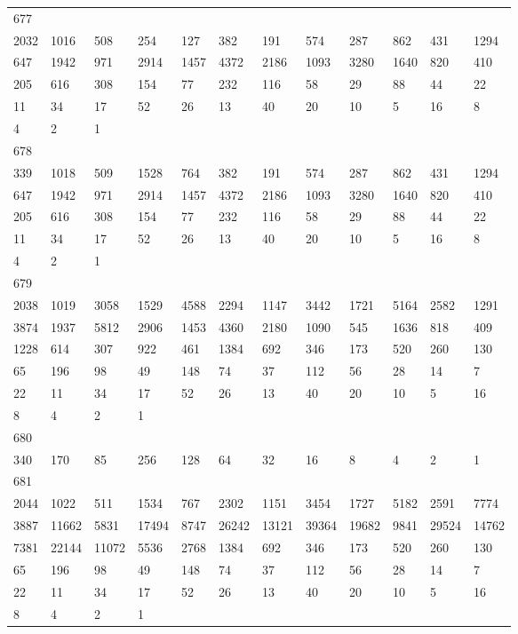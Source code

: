 \begin{longtable}{llllllllllll}
677&&&&&&&&&&&\\
2032& 1016& 508& 254& 127& 382& 191& 574& 287& 862& 431& 1294\\
647& 1942& 971& 2914& 1457& 4372& 2186& 1093& 3280& 1640& 820& 410\\
205& 616& 308& 154& 77& 232& 116& 58& 29& 88& 44& 22\\
11& 34& 17& 52& 26& 13& 40& 20& 10& 5& 16& 8\\
4& 2& 1& \\

678&&&&&&&&&&&\\
339& 1018& 509& 1528& 764& 382& 191& 574& 287& 862& 431& 1294\\
647& 1942& 971& 2914& 1457& 4372& 2186& 1093& 3280& 1640& 820& 410\\
205& 616& 308& 154& 77& 232& 116& 58& 29& 88& 44& 22\\
11& 34& 17& 52& 26& 13& 40& 20& 10& 5& 16& 8\\
4& 2& 1& \\

679&&&&&&&&&&&\\
2038& 1019& 3058& 1529& 4588& 2294& 1147& 3442& 1721& 5164& 2582& 1291\\
3874& 1937& 5812& 2906& 1453& 4360& 2180& 1090& 545& 1636& 818& 409\\
1228& 614& 307& 922& 461& 1384& 692& 346& 173& 520& 260& 130\\
65& 196& 98& 49& 148& 74& 37& 112& 56& 28& 14& 7\\
22& 11& 34& 17& 52& 26& 13& 40& 20& 10& 5& 16\\
8& 4& 2& 1& \\

680&&&&&&&&&&&\\
340& 170& 85& 256& 128& 64& 32& 16& 8& 4& 2& 1\\

681&&&&&&&&&&&\\
2044& 1022& 511& 1534& 767& 2302& 1151& 3454& 1727& 5182& 2591& 7774\\
3887& 11662& 5831& 17494& 8747& 26242& 13121& 39364& 19682& 9841& 29524& 14762\\
7381& 22144& 11072& 5536& 2768& 1384& 692& 346& 173& 520& 260& 130\\
65& 196& 98& 49& 148& 74& 37& 112& 56& 28& 14& 7\\
22& 11& 34& 17& 52& 26& 13& 40& 20& 10& 5& 16\\
8& 4& 2& 1& \\


\end{longtable}
